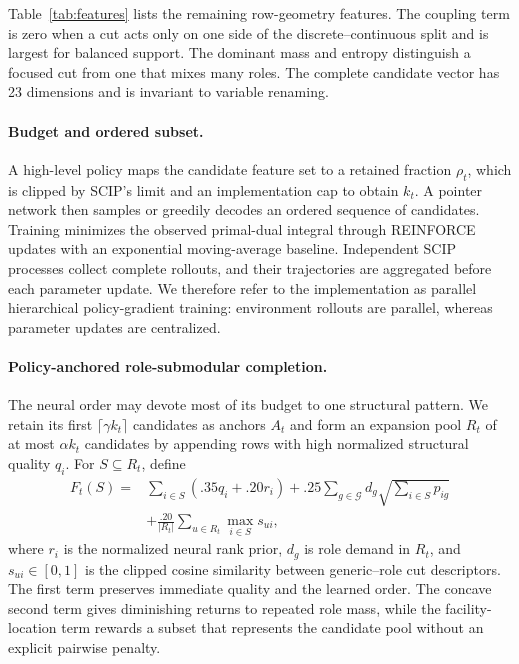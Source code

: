 \documentclass[letterpaper]{article}
\begin{document}
Table~\ref{tab:features} lists the remaining row-geometry features.
The coupling term is zero when a cut acts only on one side of the discrete--continuous split and is largest for balanced support.
The dominant mass and entropy distinguish a focused cut from one that mixes many roles.
The complete candidate vector has 23 dimensions and is invariant to variable renaming.

\paragraph{Budget and ordered subset.}
A high-level policy maps the candidate feature set to a retained fraction $\rho_t$, which is clipped by SCIP's limit and an implementation cap to obtain $k_t$.
A pointer network then samples or greedily decodes an ordered sequence of candidates.
Training minimizes the observed primal-dual integral through REINFORCE updates with an exponential moving-average baseline.
Independent SCIP processes collect complete rollouts, and their trajectories are aggregated before each parameter update.
We therefore refer to the implementation as parallel hierarchical policy-gradient training: environment rollouts are parallel, whereas parameter updates are centralized.

\paragraph{Policy-anchored role-submodular completion.}
The neural order may devote most of its budget to one structural pattern.
We retain its first $\lceil\gamma k_t\rceil$ candidates as anchors $A_t$ and form an expansion pool $R_t$ of at most $\alpha k_t$ candidates by appending rows with high normalized structural quality $q_i$.
For $S\subseteq R_t$, define
\begin{align}
F_t(S)={}&\sum_{i\in S}(.35q_i+.20r_i)
+ .25\sum_{g\in\mathcal G}d_g
\sqrt{\sum_{i\in S}p_{ig}}\nonumber\\
&+\frac{.20}{|R_t|}\sum_{u\in R_t}\max_{i\in S}s_{ui},
\label{eq:submodular}
\end{align}
where $r_i$ is the normalized neural rank prior, $d_g$ is role demand in $R_t$, and $s_{ui}\in[0,1]$ is the clipped cosine similarity between generic--role cut descriptors.
The first term preserves immediate quality and the learned order.
The concave second term gives diminishing returns to repeated role mass, while the facility-location term rewards a subset that represents the candidate pool without an explicit pairwise penalty.
\end{document}
